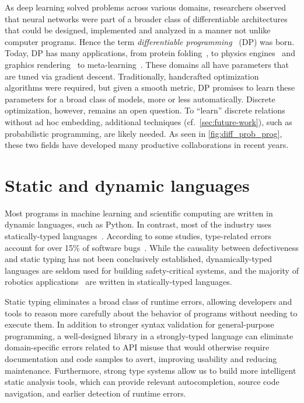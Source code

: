 \documentclass[12pt,initial,twoside,maitrise]{dms}
\numberwithin{equation}{section}
\numberwithin{table}{chapter}
\numberwithin{figure}{chapter}
\begin{document}
As deep learning solved problems across various domains, researchers observed that neural networks were part of a broader class of differentiable architectures that could be designed, implemented and analyzed in a manner not unlike computer programs. Hence the term \textit{differentiable programming}~\citep{olah2015neural} (DP) was born. Today, DP has many applications, from protein folding~\citep{alquraishi2018end}, to physics engines~\citep{hu2019difftaichi, de2018end, degrave2016differentiable} and graphics rendering~\citep{loper2014opendr} to meta-learning~\citep{liu2018darts}. These domains all have parameters that are tuned via gradient descent. Traditionally, handcrafted optimization algorithms were required, but given a smooth metric, DP promises to learn these parameters for a broad class of models, more or less automatically. Discrete optimization, however, remains an open question. To ``learn'' discrete relations without ad hoc embedding, additional techniques (cf.~\autoref{sec:future-work}), such as probabilistic programming, are likely needed. As seen in \autoref{fig:diff_prob_prog}, these two fields have developed many productive collaborations in recent years.

\section{Static and dynamic languages}

Most programs in machine learning and scientific computing are written in dynamic languages, such as Python. In contrast, most of the industry uses statically-typed languages~\citep{github}. According to some studies, type-related errors account for over 15\% of software bugs~\citep{gao2017type}. While the causality between defectiveness and static typing has not been conclusively established, dynamically-typed languages are seldom used for building safety-critical systems, and the majority of robotics applications~\citep{Areserio54:online} are written in statically-typed languages.

Static typing eliminates a broad class of runtime errors, allowing developers and tools to reason more carefully about the behavior of programs without needing to execute them. In addition to stronger syntax validation for general-purpose programming, a well-designed library in a strongly-typed language can eliminate domain-specific errors related to API misuse that would otherwise require documentation and code samples to avert, improving usability and reducing maintenance. Furthermore, strong type systems allow us to build more intelligent static analysis tools, which can provide relevant autocompletion, source code navigation, and earlier detection of runtime errors.
\end{document}
